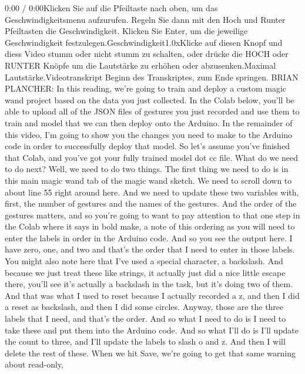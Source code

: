   0:00 / 0:00Klicken Sie auf die Pfeiltaste nach oben, um das Geschwindigkeitsmenu aufzurufen. Regeln Sie dann mit den Hoch und Runter Pfeiltasten die Geschwindigkeit. Klicken Sie Enter, um die jeweilige Geschwindigkeit festzulegen.Geschwindigkeit1.0xKlicke auf diesen Knopf und diess Video stumm oder nicht stumm zu schalten, oder drücke die HOCH oder RUNTER Knöpfe um die Lautstärke zu erhöhen oder abzusenken.Maximal Lautstärke.Videotranskript
    Beginn des Transkriptes, zum Ende springen.
    BRIAN PLANCHER: In this reading, we're going
    to train and deploy a custom magic wand project
    based on the data you just collected.
    In the Colab below, you'll be able to upload
    all of the JSON files of gestures you just recorded
    and use them to train and model that we can then deploy onto the Arduino.
    In the remainder of this video, I'm going
    to show you the changes you need to make to the Arduino code
    in order to successfully deploy that model.
    So let's assume you've finished that Colab,
    and you've got your fully trained model dot cc file.
    What do we need to do next?
    Well, we need to do two things.
    The first thing we need to do is in this main magic wand tab
    of the magic wand sketch.
    We need to scroll down to about line 55 right around here.
    And we need to update these two variables with, first,
    the number of gestures and the names of the gestures.
    And the order of the gestures matters, and so you're
    going to want to pay attention to that one step in the Colab
    where it says in bold make, a note of this
    ordering as you will need to enter the labels in order in the Arduino code.
    And so you see the output here.
    I have zero, one, and two and that's the order
    that I need to enter in those labels.
    You might also note here that I've used a special character, a backslash.
    And because we just treat these like strings,
    it actually just did a nice little escape there,
    you'll see it's actually a backslash in the task, but it's doing two of them.
    And that was what I used to reset because I actually recorded a z,
    and then I did a reset as backslash, and then I did some circles.
    Anyway, those are the three labels that I need, and that's the order.
    And so what I need to do is I need to take these and put them
    into the Arduino code.
    And so what I'll do is I'll update the count to three,
    and I'll update the labels to slash o and z.
    And then I will delete the rest of these.
    When we hit Save, we're going to get that same warning about read-only,
